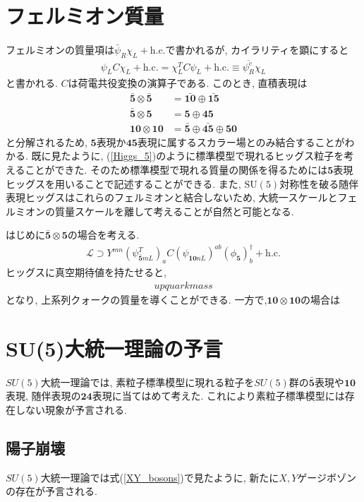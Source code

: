 \section{フェルミオン質量}
フェルミオンの質量項は$\bar{\psi}_R\chi_L +\mathrm{h.c.}$で書かれるが, カイラリティを顕にすると
\begin{align}
  \psi_L C \chi_L + \mathrm{h.c.} = \chi_L^T C \psi_L + \mathrm{h.c.} \equiv \overline{\psi_R^c}\chi_L
\end{align}
と書かれる. $C$は荷電共役変換の演算子である.
このとき, 直積表現は
\begin{align}
  \bar{\bm{5}}\otimes \bar{\bm{5}} &= \bar{\bm{10}}\oplus\bar{\bm{15}}\nonumber\\
  \bar{\bm{5}}\otimes {\bm{5}} &= \bm{5}\oplus\bm{45}\nonumber\\
  \bm{10}\otimes \bm{10} &= \bar{\bm{5}}\oplus\bar{\bm{45}}\oplus\bm{50}\nonumber
\end{align}
と分解されるため, $\bm{5}$表現か$\bm{45}$表現に属するスカラー場とのみ結合することがわかる.
既に見たように, (\ref{Higgs_5})のように標準模型で現れるヒッグス粒子を考えることができた.
そのため標準模型で現れる質量の関係を得るためには$\bm{5}$表現ヒッグスを用いることで記述することができる.
また, $\mathrm{SU(5)}$対称性を破る随伴表現ヒッグスはこれらのフェルミオンと結合しないため, 大統一スケールとフェルミオンの質量スケールを離して考えることが自然と可能となる.

はじめに$\bar{\bm{5}}\otimes {\bm{5}}$の場合を考える.
\begin{align}
  \mathcal{L} \supset Y^{mn} (\psi^T_{\bm{\bar{5}}mL})_a C (\psi_{\bm{10}nL})^{ab}(\phi_{\bm{5}})_b^\dagger +\mathrm{h.c.}
\end{align}
ヒッグスに真空期待値を持たせると,
\begin{align}
  upquark mass
\end{align}
となり, 上系列クォークの質量を導くことができる.
一方で,$ \bm{10}\otimes \bm{10}$の場合は
\section{SU(5)大統一理論の予言}
$SU(5)$大統一理論では, 素粒子標準模型に現れる粒子を$SU(5)$群の$\bar{\bm{5}}$表現や$\bm{10}$表現, 随伴表現の$\bm{24}$表現に当てはめて考えた.
これにより素粒子標準模型には存在しない現象が予言される.
\subsection{陽子崩壊}
$SU(5)$大統一理論では式(\ref{XY_bosons})で見たように, 新たに$X, Y$ゲージボゾンの存在が予言される.
